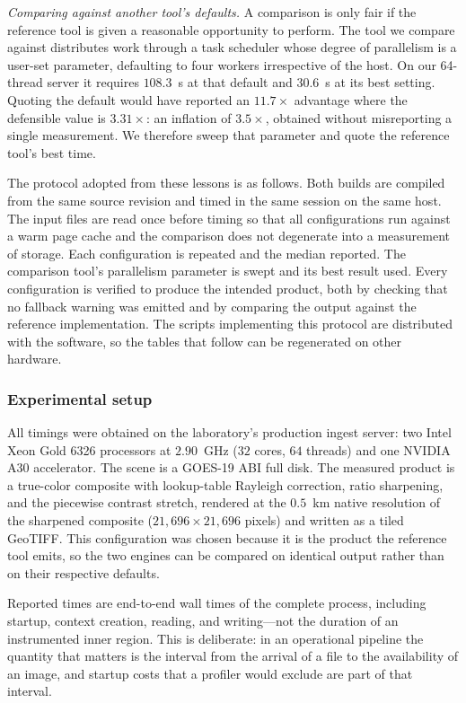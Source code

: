 \documentclass[11pt]{article}
\begin{document}
\textit{Comparing against another tool's defaults.} A comparison is only fair
if the reference tool is given a reasonable opportunity to perform. The tool we
compare against distributes work through a task scheduler whose degree of
parallelism is a user-set parameter, defaulting to four workers irrespective of
the host. On our 64-thread server it requires $108.3$~s at that default and
$30.6$~s at its best setting. Quoting the default would have reported an
$11.7\times$ advantage where the defensible value is $3.31\times$: an inflation
of $3.5\times$, obtained without misreporting a single measurement. We
therefore sweep that parameter and quote the reference tool's best time.

The protocol adopted from these lessons is as follows. Both builds are compiled
from the same source revision and timed in the same session on the same host.
The input files are read once before timing so that all configurations run
against a warm page cache and the comparison does not degenerate into a
measurement of storage. Each configuration is repeated and the median reported.
The comparison tool's parallelism parameter is swept and its best result used.
Every configuration is verified to produce the intended product, both by
checking that no fallback warning was emitted and by comparing the output
against the reference implementation. The scripts implementing this protocol
are distributed with the software, so the tables that follow can be regenerated
on other hardware.

\subsubsection{Experimental setup}
\label{sec:setup}

All timings were obtained on the laboratory's production ingest server: two
Intel Xeon Gold 6326 processors at $2.90$~GHz ($32$ cores, $64$ threads) and one
NVIDIA A30 accelerator. The scene is a GOES-19 ABI full disk. The measured
product is a true-color composite with lookup-table Rayleigh correction,
ratio sharpening, and the piecewise contrast stretch, rendered at the
$0.5$~km native resolution of the sharpened composite
($21{,}696 \times 21{,}696$ pixels) and written as a tiled GeoTIFF. This
configuration was chosen because it is the product the reference tool emits, so
the two engines can be compared on identical output rather than on their
respective defaults.

Reported times are end-to-end wall times of the complete process, including
startup, context creation, reading, and writing---not the duration of an
instrumented inner region. This is deliberate: in an operational pipeline the
quantity that matters is the interval from the arrival of a file to the
availability of an image, and startup costs that a profiler would exclude are
part of that interval.
\end{document}
